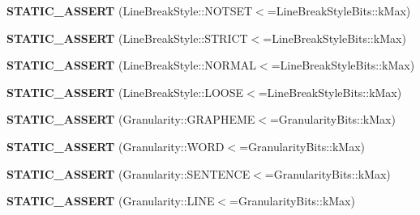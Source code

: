 \begin{DoxyCompactItemize}
{\bfseries S\+T\+A\+T\+I\+C\+\_\+\+A\+S\+S\+E\+RT} (Line\+Break\+Style\+::\+N\+O\+T\+S\+ET$<$=Line\+Break\+Style\+Bits\+::k\+Max)
\item 
\mbox{\label{classv8_1_1internal_1_1JSSegmenter_a3256057cbda7eddd3db4fa8a8cbcb1d1}} 
{\bfseries S\+T\+A\+T\+I\+C\+\_\+\+A\+S\+S\+E\+RT} (Line\+Break\+Style\+::\+S\+T\+R\+I\+CT$<$=Line\+Break\+Style\+Bits\+::k\+Max)
\item 
\mbox{\label{classv8_1_1internal_1_1JSSegmenter_ad229febe4ca29508ea5c96ae40f7eadc}} 
{\bfseries S\+T\+A\+T\+I\+C\+\_\+\+A\+S\+S\+E\+RT} (Line\+Break\+Style\+::\+N\+O\+R\+M\+AL$<$=Line\+Break\+Style\+Bits\+::k\+Max)
\item 
\mbox{\label{classv8_1_1internal_1_1JSSegmenter_a8743ec2893bab99ccfc685955e747a58}} 
{\bfseries S\+T\+A\+T\+I\+C\+\_\+\+A\+S\+S\+E\+RT} (Line\+Break\+Style\+::\+L\+O\+O\+SE$<$=Line\+Break\+Style\+Bits\+::k\+Max)
\item 
\mbox{\label{classv8_1_1internal_1_1JSSegmenter_a3b4aa5ed56d22882de906ed54af66163}} 
{\bfseries S\+T\+A\+T\+I\+C\+\_\+\+A\+S\+S\+E\+RT} (Granularity\+::\+G\+R\+A\+P\+H\+E\+ME$<$=Granularity\+Bits\+::k\+Max)
\item 
\mbox{\label{classv8_1_1internal_1_1JSSegmenter_aa4492d7158c95e8f42936e5fa3ae7296}} 
{\bfseries S\+T\+A\+T\+I\+C\+\_\+\+A\+S\+S\+E\+RT} (Granularity\+::\+W\+O\+RD$<$=Granularity\+Bits\+::k\+Max)
\item 
\mbox{\label{classv8_1_1internal_1_1JSSegmenter_a0180f84443f91ce94f1325fd42c9e1a9}} 
{\bfseries S\+T\+A\+T\+I\+C\+\_\+\+A\+S\+S\+E\+RT} (Granularity\+::\+S\+E\+N\+T\+E\+N\+CE$<$=Granularity\+Bits\+::k\+Max)
\item 
\mbox{\label{classv8_1_1internal_1_1JSSegmenter_ad40f90d0f265345c9b0ca878665708fd}} 
{\bfseries S\+T\+A\+T\+I\+C\+\_\+\+A\+S\+S\+E\+RT} (Granularity\+::\+L\+I\+NE$<$=Granularity\+Bits\+::k\+Max)
\end{DoxyCompactItemize}
